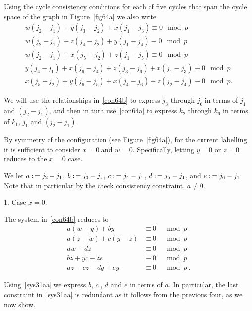 Using the cycle consistency conditions for each of five cycles that
span the cycle space of the graph in Figure~\ref{fig64a} we also
write
\begin{equation}\label{con64b}\begin{array}{cccc}
w(j_2-j_1)+y(j_3-j_2)+x(j_1-j_3) \equiv 0 \mod p\\
w(j_2-j_1)+z(j_4-j_2)+y(j_1-j_4) \equiv 0 \mod p\\
w(j_2-j_1)+x(j_5-j_2)+z(j_1-j_5) \equiv 0 \mod p\\
y(j_4-j_1)+x(j_6-j_4)+z(j_3-j_6)+x(j_1-j_3) \equiv 0 \mod p\\
x(j_5-j_2)+y(j_6-j_5)+x(j_4-j_6)+z(j_2-j_4) \equiv 0 \mod p.
\end{array}\end{equation}


We will use the relationships in~\eqref{con64b} to express $j_3$
through $j_6$ in terms of $j_1$ and $(j_2-j_1)$, and then in turn
use~\eqref{con64a} to express $k_2 $ through $k_6$ in terms of
$k_1$, $j_1$ and $(j_2-j_1)$.


 By symmetry of the
configuration (see Figure~\ref{fig64a}), for the current labelling
it is sufficient to consider $x=0$ and $w=0$. Specifically,
letting $y=0$ or $z=0$ reduces to the $x=0$ case.

We let $a \asn j_2-j_1$, $b \asn j_3-j_1$, $c \asn j_4-j_1$,
 $d \asn j_5-j_1$, and $e \asn j_6-j_1$.  Note that in particular
 by the check consistency constraint, $a \neq 0$.

1. Case $x=0$.


The system in~\eqref{con64b} reduces to
 \begin{equation}\label{sys31aa}\begin{array}{ccccc}
 a(w-y)+by &\equiv 0 &\mod p\\
 a(z-w)+c(y-z)  &\equiv 0 &\mod p\\
 aw-dz &\equiv 0 &\mod p\\
 bz+yc-ze &\equiv 0 &\mod p\\
 az-cz-dy+ey &\equiv 0 &\mod p~.
 \end{array}
 \end{equation}

Using~\eqref{sys31aa} we express $b$, $c$ , $d$ and $e$ in terms of
$a$. In particular, the last constraint in~\eqref{sys31aa} is
redundant as it follows from the previous four, as we now show.

